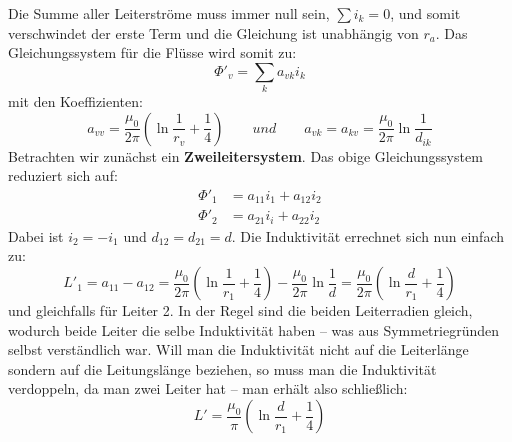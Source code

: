 Die Summe aller Leiterströme muss immer null sein, $\sum i_k=0$, und somit verschwindet der erste Term und die Gleichung ist unabhängig von $r_a$. Das Gleichungssystem für die Flüsse wird somit zu:
\begin{equation}
\Phi'_v = \sum_k a_{vk}i_k
\end{equation}
mit den Koeffizienten:
\begin{equation}
a_{vv} = \frac{\mu_0}{2\pi} \left( \ln\frac{1}{r_v} + \frac{1}{4} \right) \qquad und \qquad a_{vk} = a_{kv} = \frac{\mu_0}{2\pi} \ln\frac{1}{d_{ik}}
\end{equation}
Betrachten wir zunächst ein \textbf{Zweileitersystem}. Das obige Gleichungssystem reduziert sich auf:
\begin{align}
\Phi'_1 &= a_{11}i_1 + a_{12}i_2 \\
\Phi'_2 &= a_{21}i_i + a_{22}i_2
\end{align}
Dabei ist $i_2 = -i_1$ und $d_{12} = d_{21} = d$. Die Induktivität errechnet sich nun einfach zu:
\begin{equation}
L'_1 = a_{11} - a_{12} = \frac{\mu_0}{2\pi}\left(\ln\frac{1}{r_1}+\frac{1}{4}\right)-\frac{\mu_0}{2\pi}\ln\frac{1}{d} = 
\frac{\mu_0}{2\pi}\left(\ln\frac{d}{r_1}+\frac{1}{4}\right)
\end{equation}
und gleichfalls für Leiter 2. In der Regel sind die beiden Leiterradien gleich, wodurch beide Leiter die selbe Induktivität haben – was aus Symmetriegründen selbst verständlich war. Will man die Induktivität nicht auf die Leiterlänge sondern auf die Leitungslänge beziehen, so muss man die Induktivität verdoppeln, da man zwei Leiter hat – man erhält also schließlich:
\begin{equation}
L' = \frac{\mu_0}{\pi}\left(\ln\frac{d}{r_1}+\frac{1}{4}\right)
\end{equation}

